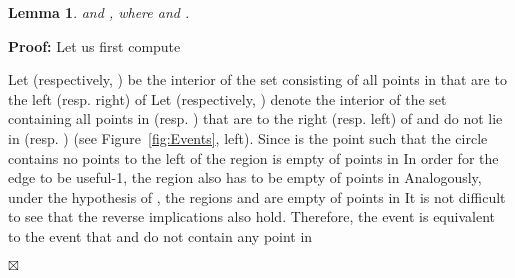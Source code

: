 \documentclass {journal}
\newtheorem {lemma} {Lemma}
\newenvironment {proof}{\textbf {Proof:}}{\hfill \ensuremath {\boxtimes}}
\begin{document}
\begin{lemma}\label{lem_e1_e2}
 and , where  and .
\end{lemma}
\begin{proof}
Let us first compute 

Let  (respectively, )  be the interior of the set
consisting of all points in  that are to
the left (resp. right) of  Let 
(respectively, ) denote the interior of the set containing
all points in  (resp. ) that are to the right
(resp. left) of  and do not lie in 
(resp. ) (see Figure~\ref{fig:Events}, left).
 Since  is the point such that the
circle  contains no points to the left of
 the region  is empty of points in
 In order for the edge  to be useful-1, the region  also has to be empty of points in 
Analogously, under the hypothesis of , the regions
 and  are empty of points in  It is not
difficult to see that the reverse implications also hold.
Therefore, the event  is equivalent to the event
that    and  do not contain any point in



\end{proof}
\end{document}
